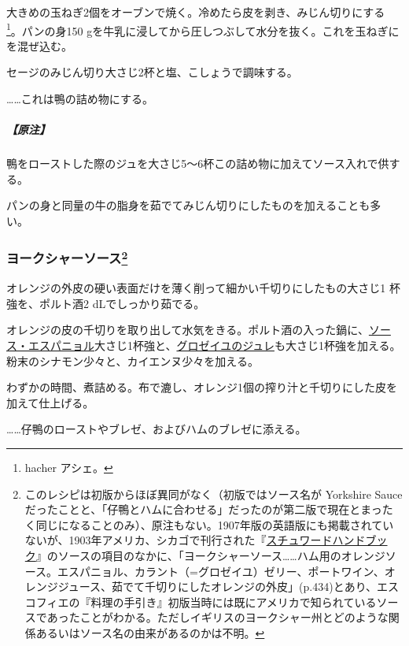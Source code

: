 \begin{recette}
大きめの玉ねぎ2個をオーブンで焼く。冷めたら皮を剥き、みじん切りにする
\footnote{hacher アシェ。}。パンの身150
gを牛乳に浸してから圧しつぶして水分を抜く。これを玉ねぎにを混ぜ込む。

セージのみじん切り大さじ2杯と塩、こしょうで調味する。

\ldots{}\ldots{}これは鴨の詰め物にする。

\hypertarget{nota-sage-and-onions-sauce}{%
\subparagraph{【原注】}\label{nota-sage-and-onions-sauce}}

鴨をローストした際のジュを大さじ5〜6杯この詰め物に加えてソース入れで供する。

パンの身と同量の牛の脂身を茹でてみじん切りにしたものを加えることも多い。

\hypertarget{sauce-yorkshire}{%
\subsubsection[ヨークシャーソース]{\texorpdfstring{ヨークシャーソース\footnote{このレシピは初版からほぼ異同がなく（初版ではソース名が
  Yorkshire
  Sauceだったことと、「仔鴨とハムに合わせる」だったのが第二版で現在とまったく同じになることのみ）、原注もない。1907年版の英語版にも掲載されていないが、1903年アメリカ、シカゴで刊行された『\href{https://archive.org/details/stewardshandbook00whitiala}{スチュワードハンドブック}』のソースの項目のなかに、「ヨークシャーソース\ldots{}\ldots{}ハム用のオレンジソース。エスパニョル、カラント（=グロゼイユ）ゼリー、ポートワイン、オレンジジュース、茹でて千切りにしたオレンジの外皮」(p.434)とあり、エスコフィエの『料理の手引き』初版当時には既にアメリカで知られているソースであったことがわかる。ただしイギリスのヨークシャー州とどのような関係あるいはソース名の由来があるのかは不明。}}{ヨークシャーソース}}\label{sauce-yorkshire}}



オレンジの外皮の硬い表面だけを薄く削って細かい千切りにしたもの大さじ1
杯強を、ポルト酒2 dLでしっかり茹でる。

オレンジの皮の千切りを取り出して水気をきる。ポルト酒の入った鍋に、\protect\hyperlink{sauce-espagnole}{ソース・エスパニョル}大さじ1杯強と、\protect\hyperlink{}{グロゼイユのジュレ}も大さじ1杯強を加える。粉末のシナモン少々と、カイエンヌ少々を加える。

わずかの時間、煮詰める。布で漉し、オレンジ1個の搾り汁と千切りにした皮を加えて仕上げる。

\ldots{}\ldots{}仔鴨のローストやブレゼ、およびハムのブレゼに添える。
\end{recette}